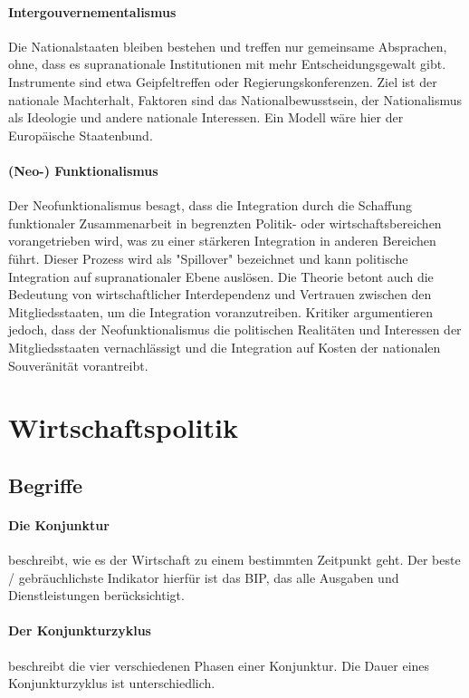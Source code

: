 \documentclass{article}
\begin{document}
	\paragraph{Intergouvernementalismus}
	Die Nationalstaaten bleiben bestehen und treffen nur gemeinsame Absprachen, ohne, dass es supranationale Institutionen mit mehr Entscheidungsgewalt gibt. Instrumente sind etwa Geipfeltreffen oder Regierungskonferenzen. Ziel ist der nationale Machterhalt, Faktoren sind das Nationalbewusstsein, der Nationalismus als Ideologie und andere nationale Interessen. Ein Modell wäre hier der Europäische Staatenbund. 

	\paragraph{(Neo-) Funktionalismus}
	Der Neofunktionalismus besagt, dass die Integration durch die Schaffung funktionaler Zusammenarbeit in begrenzten Politik- oder wirtschaftsbereichen vorangetrieben wird, was zu einer stärkeren Integration in anderen Bereichen führt. Dieser Prozess wird als "Spillover" bezeichnet und kann politische Integration auf supranationaler Ebene auslösen. Die Theorie betont auch die Bedeutung von wirtschaftlicher Interdependenz und Vertrauen zwischen den Mitgliedsstaaten, um die Integration voranzutreiben. Kritiker argumentieren jedoch, dass der Neofunktionalismus die politischen Realitäten und Interessen der Mitgliedsstaaten vernachlässigt und die Integration auf Kosten der nationalen Souveränität vorantreibt.

	\section{Wirtschaftspolitik}
	\subsection{Begriffe}

	\paragraph{Die Konjunktur}
	beschreibt, wie es der Wirtschaft zu einem bestimmten Zeitpunkt geht. Der beste / gebräuchlichste Indikator hierfür ist das BIP, das alle Ausgaben und Dienstleistungen berücksichtigt.

	\paragraph{Der Konjunkturzyklus}
	beschreibt die vier verschiedenen Phasen einer Konjunktur. Die Dauer eines Konjunkturzyklus ist unterschiedlich.
\end{document}
